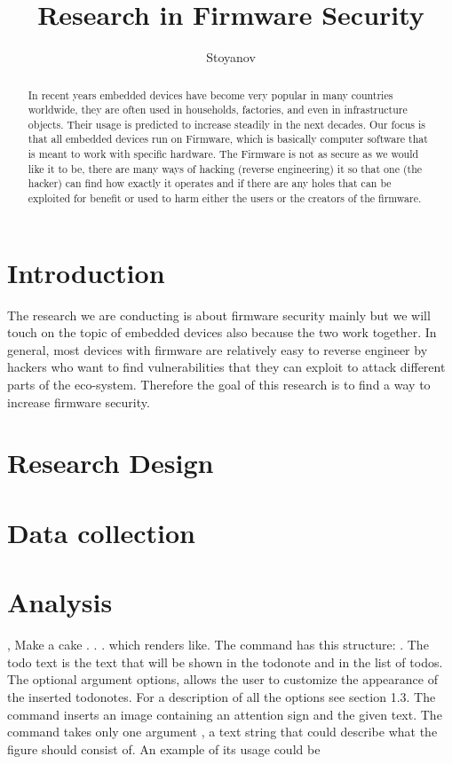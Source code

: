 \documentclass[]{report}
\title{Research in Firmware Security}
\author{Stoyanov}
\begin{document}
\maketitle

\begin{abstract}
	In recent years embedded devices have become very popular in many countries worldwide, they are often used in households, factories, and even in infrastructure objects. Their usage is predicted to increase steadily in the next decades. Our focus is that all embedded devices run on Firmware, which is basically computer software that is meant to work with specific hardware. The Firmware is not as secure as we would like it to be, there are many ways of hacking (reverse engineering) it so that one (the hacker) can find how exactly it operates and if there are any holes that can be exploited for benefit or used to harm either the users or the creators of the firmware.
\end{abstract}

\section{Introduction}
The research we are conducting is about firmware security mainly but we will touch on the topic of embedded devices also because the two work together. In general, most devices with firmware are relatively easy to reverse engineer by hackers who want to find vulnerabilities that they can exploit to attack different parts of the eco-system. Therefore the goal of this research is to find a way to increase firmware security.
\section{Research Design}

\section{Data collection}
\section{Analysis}



,
Make a cake . . . which renders like. The \todo command has this structure: . The todo text is the text that will be shown in the todonote and in the
list of todos. The optional argument options, allows the user to customize the
appearance of the inserted todonotes. For a description of all the options see
section 1.3.
\missingfigure The \missingfigure command inserts an image containing an attention sign
and the given text. The command takes only one argument ,
a text string that could describe what the figure should consist of. An example of
its usage could be
\end{document}
